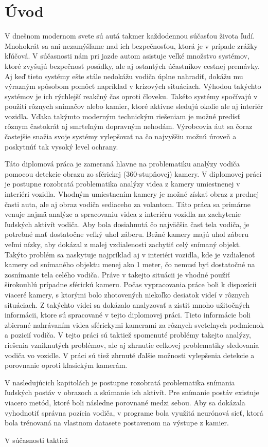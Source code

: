 \documentclass[slovak,master,dept460,male,cpp,cpdeclaration]{diploma}
\begin{document}
\MakeTitlePages

\section{Úvod}
\label{sec:Introduction}
V dnešnom modernom svete sú autá takmer každodennou súčasťou života ľudí. Mnohokrát sa ani nezamýšľame nad ich bezpečnosťou, ktorá je v prípade zrážky kľúčová. V súčasnosti nám pri jazde autom asistuje veľké množstvo systémov, ktoré zvyšujú bezpečnosť posádky, ale aj ostantých účastníkov cestnej premávky. Aj keď tieto systémy ešte stále nedokážu vodiča úplne nahradiť, dokážu mu výrazným spôsobom pomôcť napríklad v krízových situáciach. Výhodou takýchto systémov je ich rýchlejší reakčný čas oproti človeku. Takéto systémy spočívajú v použití rôznych snímačov alebo kamier, ktoré aktívne sledujú okolie ale aj interiér vozidla. Vďaka takýmto moderným technickým riešeniam je možné predísť rôznym  častokrát aj smrteľným dopravným nehodám. Výrobcovia áut sa čoraz častejšie snažia svoje systémy vylepšovať na čo najvyššiu možnú úroveň a poskytnúť tak vysoký level ochrany.\par Táto diplomová práca je zameraná hlavne na problematiku analýzy vodiča pomocou detekcie obrazu zo sférickej (360-stupňovej) kamery. V diplomovej práci je postupne rozobratá problematika analýzy videa z kamery umiestnenej v interiéri vozidla. Vhodným umiestnením kamery je možné získať obraz z prednej časti auta, ale aj obraz vodiča sediaceho za volantom. Táto práca sa primárne venuje najmä analýze a spracovaniu videa z interiéru vozidla na zachytenie ľudských aktivít vodiča. Aby bola dosiahnutá čo najväčšia časť tela vodiča, je potrebné mať dostatočne veľký uhol záberu. Bežné kamery majú uhol záberu veľmi nízky, aby dokázal z malej vzdialenosti zachytiť celý snímaný objekt. Takýto problém sa naskytuje najpríklad aj v interiéri vozidla, kde je vzdialenoť kamery od snímaného objektu menej ako 1 meter, čo nemusí byť dostatočné na zosnímanie tela celého vodiča. Práve v takejto situácii je vhodné použiť širokouhlú prípadne sférickú kameru. Počas vypracovania práce boli k dispozícii viaceré kamery, s ktorými bolo zhotovených niekoľko desiatok videí v rôznych situáciach. Z takýchto videi sa dokázalo analyzovať a zistiť mnoho užitočných informácii, ktore sú spracované v tejto diplomovej práci. Tieto informácie boli zbierané nahrávaním videa sférickymi kamerami za rôznych svetelnych  podmienok a pozicií vodiča. V tejto práci sú taktiež spomenuté problémy takejto analýzy, riešenia vzniknutých problémov, ale aj zhrnutie celkovej problematiky sledovania vodiča vo vozidle. V práci sú tiež zhrnuté ďalšie možnosti vylepšenia detekcie a porovnanie oproti klasickým kamerám.\par V nasledujúcich kapitolách je postupne rozobratá problematika snímania ľudských postáv v obrazoch a skúmanie ich aktivít. Pre snímanie postáv existuje viacero metód, ktoré boli následne porovnané medzi sebou. Aby sa dokázala vyhodnotiť správna pozícia vodiča, v programe bola využitá neurónová sieť, ktorá bola trénovaná na vlastnom datasete postavenom na výstupe z kamier.\par V súčasnosti taktiež 
\end{document}
